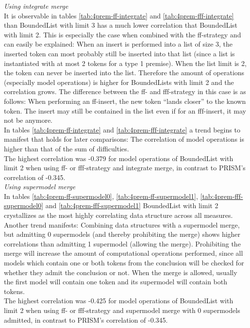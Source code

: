 \documentclass[hidelinks]{scrartcl}
\begin{document}
\textit{Using integrate merge} \\
It is observable in tables \ref{tab:4prem-ff-integrate} and \ref{tab:4prem-fff-integrate} than BoundedList with limit 3 has a much lower correlation that BoundedList with limit 2. This is especially the case when combined with the ff-strategy and can easily be explained: When an insert is performed into a list of size 3, the inserted \gls{token} can most probably still be inserted into that list (since a list is instantiated with at most 2 \gls{token}s for a type 1 \gls{premise}). When the list limit is 2, the \gls{token} can never be inserted into the list. Therefore the amount of operations (especially model operations) is higher for BoundedLists with limit 2 and the correlation grows. The difference between the ff- and fff-strategy in this case is as follows: When performing an ff-insert, the new \gls{token} ``lands closer'' to the known \gls{token}. The insert may still be contained in the list even if for an fff-insert, it may not be anymore. \\
In tables \ref{tab:4prem-ff-integrate} and \ref{tab:4prem-fff-integrate} a trend begins to manifest that holds for later comparisons: The correlation of model operations is higher than that of the sum of difficulties. \\
The highest correlation was -0.379 for model operations of BoundedList with limit 2 when using ff- or fff-strategy and integrate merge, in contrast to PRISM's correlation of -0.345. \\

\textit{Using supermodel merge} \\
In tables \ref{tab:4prem-ff-supermodel0}, \ref{tab:4prem-ff-supermodel1}, \ref{tab:4prem-fff-supermodel0} and \ref{tab:4prem-fff-supermodel1} BoundedList with limit 2 crystallizes as the most highly correlating data structure across all measures. \\
Another trend manifests: Combining data structures with a supermodel merge, but admitting 0 supermodels (and thereby prohibiting the merge) shows higher correlations than admitting 1 supermodel (allowing the merge). Prohibiting the merge will increase the amount of computational operations performed, since all models which contain one or both \gls{token}s from the conclusion will be checked for whether they admit the conclusion or not. When the merge is allowed, usually the first model will contain one \gls{token} and its supermodel will contain both \gls{token}s. \\
The highest correlation was -0.425 for model operations of BoundedList with limit 2 when using ff- or fff-strategy and supermodel merge with 0 supermodels admitted, in contrast to PRISM's correlation of -0.345. \\
\end{document}
